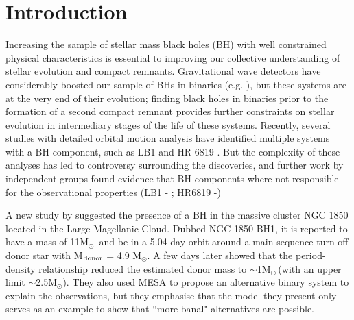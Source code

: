 \documentclass[fleqn,usenatbib]{mnras}
\newcommand{\msol} {M$_{\odot}$}
\newcommand{\about} {$\sim$}
\begin{document}
\section{Introduction}
\label{sec:intro}
Increasing the sample of stellar mass black holes (BH) with well constrained physical characteristics is essential to improving our collective understanding of stellar evolution and compact remnants. 
Gravitational wave detectors have considerably boosted our sample of BHs in binaries (e.g. \citealt{lvk2021}), but these systems are at the very end of their evolution; finding black holes in binaries prior to the formation of a second compact remnant provides further constraints on stellar evolution in intermediary stages of the life of these systems.
Recently, several studies with detailed orbital motion analysis have identified multiple systems with a BH component, such as LB1 and  HR 6819 \citep{liu2019, rivinius2020}.
But the complexity of these analyses has led to controversy surrounding the discoveries, and further work by independent groups found evidence that BH components where not responsible for the observational properties (LB1 - \citealt{irrgang2020,shenar2020, abdul-masih2020, el-badry2020}; HR6819 -\citealt{bodensteiner2020})

A new study by \cite{saracino2021} suggested the presence of a BH in the massive cluster NGC 1850 located in the Large Magellanic Cloud. 
Dubbed NGC 1850 BH1, it is reported to have a mass of 11\msol\ and be in a 5.04 day orbit around a main sequence turn-off donor star with M$_{\rm donor}$ = 4.9 \msol.
A few days later \cite{el-badry2021} showed that the period-density relationship reduced the estimated donor mass to \about 1\msol\,(with an upper limit \about2.5\msol).
They also used MESA \citep{Paxton2011, Paxton2013, Paxton2015, Paxton2018, Paxton2019} to propose an alternative binary system to explain the observations, but they emphasise that the model they present only serves as an example to show that ``more banal" alternatives are possible.
\end{document}
